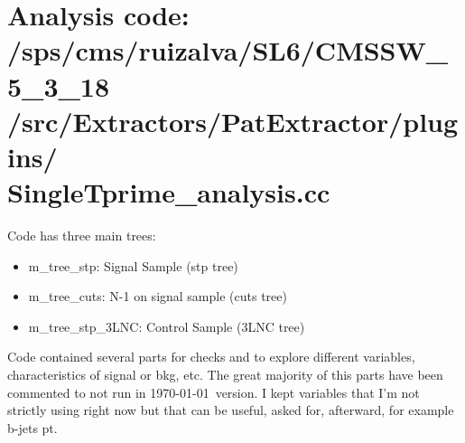 \documentclass[11pt,a4paper]{article}
\begin{document}
\section{Analysis code: /sps/cms/ruizalva/SL6/CMSSW\_5\_3\_18\\/src/Extractors/PatExtractor/plugins/\\SingleTprime\_analysis.cc}

Code has three main trees:
\begin{itemize}
\item m\_tree\_stp: Signal Sample (stp tree)
\item m\_tree\_cuts: N-1 on signal sample (cuts tree)
\item m\_tree\_stp\_3LNC: Control Sample (3LNC tree)
\end{itemize}

Code contained several parts for checks and to explore different variables, characteristics of signal or bkg, etc. The great majority of this parts have been commented to not run in \today~version. I kept variables that I'm not strictly using right now but that can be useful, asked for, afterward, for example b-jets pt.
\end{document}
